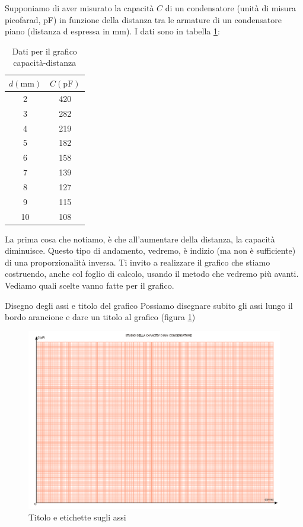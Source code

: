 \documentclass[12pt,a4paper,oneside]{book}
\makeatletter
\renewcommand{\subsection}{\@startsection {subsection}{2}{\z@}
{-3ex \@plus -0.1ex \@minus -.4ex}
{0.5ex \@plus.2ex }
{\color[rgb]{0.141,0.596,0.749}\normalfont\sffamily\bfseries}}
\theoremstyle{esercizio}
\makeatother
\begin{document}
Supponiamo di aver misurato la capacità $C$ di un condensatore (unità di misura picofarad, pF)  in funzione della distanza tra le armature di un condensatore piano (distanza d espressa in mm). I dati sono in tabella \ref{tab:condensatore}: 

\begin{table}
\begin{center}
{
\def\arraystretch{1.5} %
\begin{tabular}{|c|c|}
\hline 
 $d\left( \si{\milli\meter}\right)$ & $C \left( \si{\pico\farad}\right)$   \\
\hline
2 & 420\\
3 &  282 \\
4 &  219 \\
5 & 182 \\
6 & 158 \\
7 &  139\\
8 &  127\\
9  & 115\\
10 & 108\\
\hline
\end{tabular}
}
\caption{Dati per il grafico capacità-distanza}
\label{tab:condensatore}
\end{center}
\end{table}
La prima cosa che notiamo, è che all'aumentare della distanza, la capacità diminuisce. Questo tipo di andamento, vedremo, è indizio (ma non è sufficiente) di una proporzionalità inversa. Ti invito a realizzare il grafico che stiamo costruendo, anche col foglio di calcolo, usando il metodo che vedremo più avanti. Vediamo quali scelte vanno fatte per il grafico.
\subsection{Disegno degli assi e titolo del grafico}
Possiamo disegnare subito gli assi lungo il bordo arancione e dare un titolo al grafico (figura \ref{fig:titoloassi})

   \begin{figure}[h!]
    \centering
    \includegraphics[width=\linewidth]{img/titoloassi.pdf} 
    \caption{Titolo e  etichette sugli assi}
    \label{fig:titoloassi}
\end{figure}  
\end{document}
